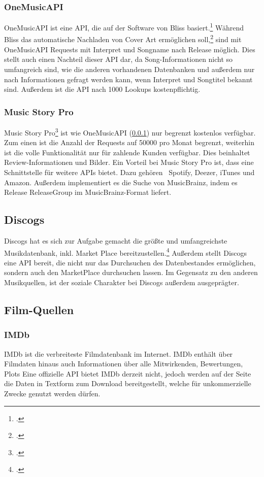 \subsubsection{OneMusicAPI}\label{subsubsec:OneMusicAPI}
OneMusicAPI ist eine API, die auf der Software von Bliss basiert.\footcite[Vgl.][]{oneMusicAPI} Während Bliss das automatische Nachladen von Cover Art ermöglichen soll,\footcite[Vgl.][]{bliss} sind mit OneMusicAPI Requests mit Interpret und Songname nach Release möglich. Dies stellt auch einen Nachteil dieser API dar, da Song-Informationen nicht so umfangreich sind, wie die anderen vorhandenen Datenbanken und außerdem nur nach Informationen gefragt werden kann, wenn Interpret und Songtitel bekannt sind. Außerdem ist die API nach 1000 Lookups kostenpflichtig.

\subsubsection{Music Story Pro}
Music Story Pro\footcite[Vgl.][]{musicStoryPro} ist wie OneMusicAPI (\ref{subsubsec:OneMusicAPI}) nur begrenzt kostenlos verfügbar. Zum einen ist die Anzahl der Requests auf 50000 pro Monat begrenzt, weiterhin ist die volle Funktionalität nur für zahlende Kunden verfügbar. Dies beinhaltet \zB Review-Informationen und Bilder. Ein Vorteil bei Music Story Pro ist, dass eine Schnittstelle für weitere APIs bietet. Dazu gehören \ua \ Spotify, Deezer, iTunes und Amazon. Außerdem implementiert es die Suche von MusicBrainz, indem es \gls{Release} \gls{ReleaseGroup} im MusicBrainz-Format liefert.

\subsection{Discogs}
Discogs hat es sich zur Aufgabe gemacht die größte und umfangreichste Musikdatenbank, inkl. Market Place bereitzustellen.\footcite[Vgl.][]{discogs} Außerdem stellt Discogs eine API bereit, die nicht nur das Durchsuchen des Datenbestandes ermöglichen, sondern auch den MarketPlace durchsuchen lassen. Im Gegensatz zu den anderen Musikquellen, ist der soziale Charakter bei Discogs außerdem ausgeprägter.

\subsection{Film-Quellen}
\subsubsection{IMDb}
IMDb ist die verbreiteste Filmdatenbank im Internet. IMDb enthält über Filmdaten hinaus auch Informationen über alle Mitwirkenden, Bewertungen, Plots \uvm Eine offizielle API bietet IMDb derzeit nicht, jedoch werden auf der Seite die Daten in Textform zum Download bereitgestellt, welche für unkommerzielle Zwecke genutzt werden dürfen.

